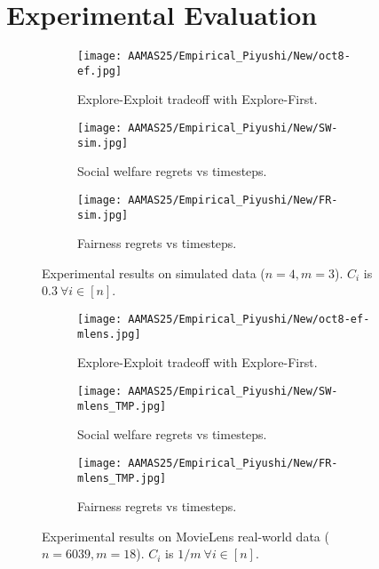  
\section{Experimental Evaluation}
\label{sec: simulation}

\begin{figure*}[ht!]
\centering
\begin{subfigure}{.33\textwidth}
    \centering
    \texttt{[image: AAMAS25/Empirical\_Piyushi/New/oct8-ef.jpg]}  
    \caption{Explore-Exploit tradeoff with {\sc Explore-First}.
    }
    \label{sim1}
\end{subfigure}
\begin{subfigure}{.33\textwidth}
    \centering
    \texttt{[image: AAMAS25/Empirical\_Piyushi/New/SW-sim.jpg]}  
    \caption{Social welfare regrets vs timesteps.}
    \label{sim2}
\end{subfigure}
\begin{subfigure}{.33\textwidth}
    \centering
    \texttt{[image: AAMAS25/Empirical\_Piyushi/New/FR-sim.jpg]}  
    \caption{Fairness regrets vs timesteps.}
    \label{sim3}
\end{subfigure} 
    \caption{Experimental results on simulated data ($n=4, m=3$). $C_i$ is $0.3\ \forall i \in [n]$.}
    \label{fig:rewardfair_ucb-sim}
\end{figure*} 

\begin{figure*}[ht!]
\centering
\begin{subfigure}{.33\textwidth}
    \centering
    \texttt{[image: AAMAS25/Empirical\_Piyushi/New/oct8-ef-mlens.jpg]}  
    \caption{Explore-Exploit tradeoff with {\sc Explore-First}.
    }
    \label{rw1}
\end{subfigure}
\begin{subfigure}{.33\textwidth}
    \centering
    \texttt{[image: AAMAS25/Empirical\_Piyushi/New/SW-mlens\_TMP.jpg]}  
    \caption{Social welfare regrets vs timesteps.}
    \label{rw2}
\end{subfigure}
\begin{subfigure}{.33\textwidth}
    \centering
    \texttt{[image: AAMAS25/Empirical\_Piyushi/New/FR-mlens\_TMP.jpg]}  
    \caption{Fairness regrets vs timesteps.}
    \label{rw3}
\end{subfigure}
    \caption{Experimental results on MovieLens real-world data ($n=6039, m=18$). $C_i$ is $1/m \ \forall i \in [n]$.}
    \label{fig:rewardfair_ucb}
\end{figure*} 

